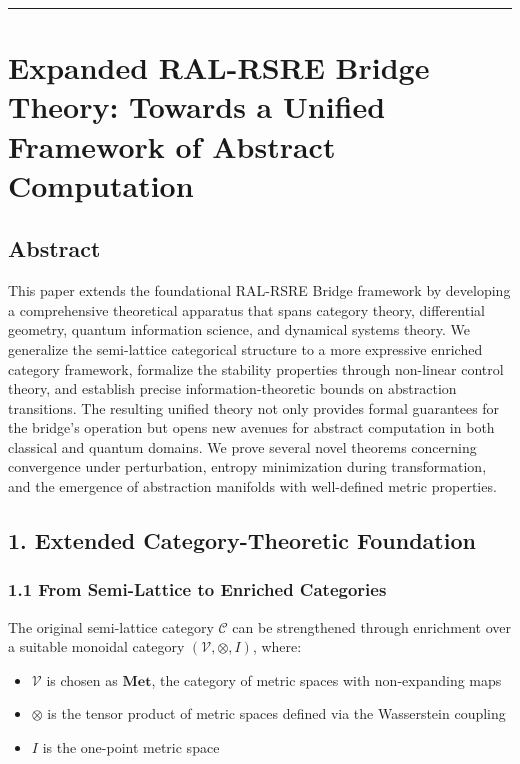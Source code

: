 \documentclass[
]{article}
\providecommand{\tightlist}{%
  \setlength{\itemsep}{0pt}\setlength{\parskip}{0pt}}
\begin{document}
\begin{center}\rule{0.5\linewidth}{0.5pt}\end{center}

\section{Expanded RAL-RSRE Bridge Theory: Towards a Unified Framework of
Abstract Computation}\label{8-ral-rsre-bridge-theory}

\subsection{Abstract}\label{abstract-2}

This paper extends the foundational RAL-RSRE Bridge framework by
developing a comprehensive theoretical apparatus that spans category
theory, differential geometry, quantum information science, and
dynamical systems theory. We generalize the semi-lattice categorical
structure to a more expressive enriched category framework, formalize
the stability properties through non-linear control theory, and
establish precise information-theoretic bounds on abstraction
transitions. The resulting unified theory not only provides formal
guarantees for the bridge's operation but opens new avenues for abstract
computation in both classical and quantum domains. We prove several
novel theorems concerning convergence under perturbation, entropy
minimization during transformation, and the emergence of abstraction
manifolds with well-defined metric properties.

\subsection{1. Extended Category-Theoretic
Foundation}\label{extended-category-theoretic-foundation}

\subsubsection{1.1 From Semi-Lattice to Enriched
Categories}\label{from-semi-lattice-to-enriched-categories}

The original semi-lattice category \(\mathcal{C}\) can be strengthened
through enrichment over a suitable monoidal category
\((\mathcal{V}, \otimes, I)\), where:

\begin{itemize}
\tightlist
\item
  \(\mathcal{V}\) is chosen as \(\mathbf{Met}\), the category of metric
  spaces with non-expanding maps
\item
  \(\otimes\) is the tensor product of metric spaces defined via the
  Wasserstein coupling
\item
  \(I\) is the one-point metric space
\end{itemize}
\end{document}
